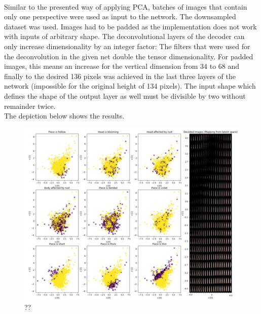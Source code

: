 \\
Similar to the presented way of applying PCA, batches of images that contain only one perspective were used as input to the network. The downsampled dataset was used. Images had to be padded as the implementation does not work with inputs of arbitrary shape. The deconvolutional layers of the decoder can only increase dimensionality by an integer factor: The filters that were used for the deconvolution in the given net double the tensor dimensionality. For padded images, this means an increase for the vertical dimension from 34 to 68 and finally to the desired 136 pixels was achieved in the last three layers of the network (impossible for the original height of 134 pixels). The input shape which defines the shape of the output layer as well must be divisible by two without remainder twice.  \\
The depiction below shows the results. \\

\begin{figure}[h]
	\centering
	\includegraphics[scale=0.8]{Figures/chapter04/autoencoder}
	\decoRule
	\caption[??]{??}
	\label{fig:Autoencoder}
\end{figure}

